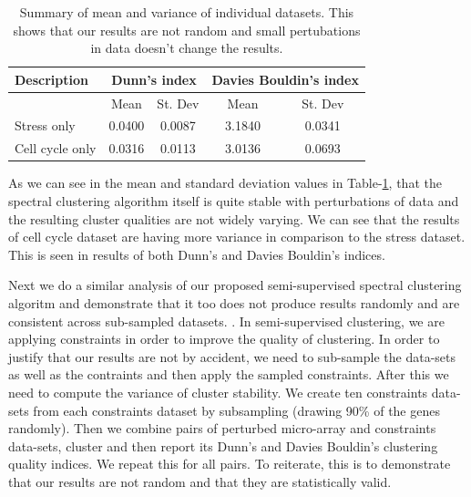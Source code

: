 \begin{table}
\centering
\begin{tabular}{|l|c|c|c|c|}
\hline
Description & \multicolumn{2}{|c|}{Dunn’s index}  & \multicolumn{2}{|c|}{Davies Bouldin’s index}\\
\hline
 & Mean & St. Dev & Mean & St. Dev\\
\hline
Stress only  & 0.0400 & 0.0087 & 3.1840 & 0.0341 \\
Cell cycle only & 0.0316 & 0.0113 & 3.0136 & 0.0693 \\
\hline 
\end{tabular}
\caption{Summary of mean and variance of individual datasets. This shows that our results are not random and small pertubations in data doesn’t change the results.}
\label{tab:stress_ccycle_perturb}
\end{table}

As we can see in the mean and standard deviation values in Table-\ref{tab:stress_ccycle_perturb}, that the spectral clustering algorithm itself is quite stable with perturbations of 
data and the resulting cluster qualities are not widely varying. We can see that the results of cell cycle dataset are having more variance in comparison to the stress dataset. This is seen in results of both Dunn's and Davies Bouldin's indices.

Next we do a similar analysis of our proposed semi-supervised spectral clustering algoritm and demonstrate that it too does not produce results randomly and are consistent across sub-sampled datasets. . In semi-supervised clustering, we are applying constraints in order to improve the quality 
of clustering. In order to justify that our results are not by accident, we need to sub-sample the data-sets as well as the contraints and then apply the sampled constraints. After this we need to compute the 
variance of cluster stability. We create ten constraints data-sets from each constraints dataset by subsampling (drawing 90\% of the genes randomly). Then we combine pairs of perturbed micro-array and constraints data-sets, 
cluster and then report its Dunn’s and Davies Bouldin's clustering quality indices. We repeat this for all pairs. To reiterate, this is to demonstrate that our results are not 
random and that they are statistically valid.

